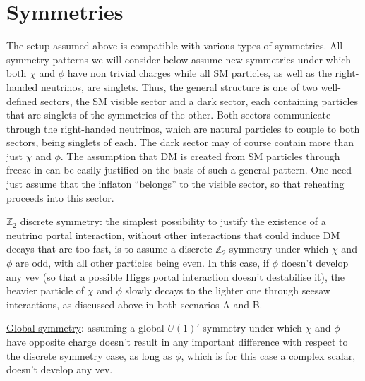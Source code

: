 \documentclass[prd,a4paper,twocolumn,preprintnumbers,nofootinbib,superscriptaddress]{revtex4}
\newcommand{\rupert}[1]{\textcolor{blue}{#1}}
\begin{document}
	
\section{Symmetries}
	
The setup assumed above is compatible with various types of symmetries. All symmetry patterns we will consider below assume new symmetries under which both $\chi$ and $\phi$ have non trivial charges while all SM particles, as well as the right-handed neutrinos, are singlets. Thus, the general structure is one of two well-defined sectors, the SM visible sector and a dark sector, each containing particles that are singlets of the symmetries of the other. Both sectors communicate through the right-handed neutrinos, which are natural particles to couple to both sectors, being singlets of each. The dark sector may of course contain more than just $\chi$ and $\phi$. The assumption that DM is created from SM particles through freeze-in can be easily justified on the basis of such a general pattern. One need just assume that the inflaton ``belongs'' to the visible sector, so that reheating proceeds into this sector.
	
	
\underline{$\mathbb{Z}_2$ discrete symmetry}: the simplest possibility to justify the existence of a neutrino portal interaction, without  other interactions that could induce DM decays that are too fast, is to assume a discrete $\mathbb{Z}_2$ symmetry under which $\chi$ and $\phi$ are odd, with all other particles being even. In this case, if $\phi$ doesn't develop any vev (so that a possible Higgs portal interaction doesn't destabilise it), the heavier particle of $\chi$ and $\phi$ slowly decays to the lighter one through seesaw interactions, as discussed above in both scenarios A and B.
	
\underline{Global symmetry}: assuming a global $U(1)'$ symmetry under which $\chi$ and $\phi$  have opposite charge doesn't result in any important difference with respect to the discrete symmetry case, as long as $\phi$, which is for this case a complex scalar, doesn't develop any vev. %
	
\end{document}
